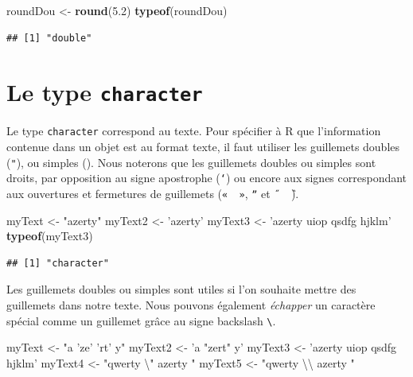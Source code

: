 \documentclass[
]{book}
\newenvironment{Shaded}{\begin{snugshade}}{\end{snugshade}}
\newcommand{\CharTok}[1]{\textcolor[rgb]{0.31,0.60,0.02}{#1}}
\newcommand{\FloatTok}[1]{\textcolor[rgb]{0.00,0.00,0.81}{#1}}
\newcommand{\KeywordTok}[1]{\textcolor[rgb]{0.13,0.29,0.53}{\textbf{#1}}}
\newcommand{\NormalTok}[1]{#1}
\newcommand{\StringTok}[1]{\textcolor[rgb]{0.31,0.60,0.02}{#1}}
\begin{document}
\begin{Shaded}
\begin{Highlighting}[]
\NormalTok{roundDou <-}\StringTok{ }\KeywordTok{round}\NormalTok{(}\FloatTok{5.2}\NormalTok{)}
\KeywordTok{typeof}\NormalTok{(roundDou)}
\end{Highlighting}
\end{Shaded}

\begin{verbatim}
## [1] "double"
\end{verbatim}

\hypertarget{le-type-character}{%
\section{\texorpdfstring{Le type \texttt{character}}{Le type character}}\label{le-type-character}}

Le type \texttt{character} correspond au texte. Pour spécifier à R que l'information contenue dans un objet est au format texte, il faut utiliser les guillemets doubles (\texttt{"}), ou simples (\texttt{\textquotesingle{}}). Nous noterons que les guillemets doubles ou simples sont droits, par opposition au signe apostrophe (\texttt{‘}) ou encore aux signes correspondant aux ouvertures et fermetures de guillemets (\texttt{«\ \ »}, \texttt{ˮ} et \texttt{˝\ \ ̏}).

\begin{Shaded}
\begin{Highlighting}[]
\NormalTok{myText <-}\StringTok{ "azerty"}
\NormalTok{myText2 <-}\StringTok{ 'azerty'}
\NormalTok{myText3 <-}\StringTok{ 'azerty uiop qsdfg hjklm'}
\KeywordTok{typeof}\NormalTok{(myText3)}
\end{Highlighting}
\end{Shaded}

\begin{verbatim}
## [1] "character"
\end{verbatim}

Les guillemets doubles ou simples sont utiles si l'on souhaite mettre des guillemets dans notre texte. Nous pouvons également \emph{échapper} un caractère spécial comme un guillemet grâce au signe backslash \texttt{\textbackslash{}}.

\begin{Shaded}
\begin{Highlighting}[]
\NormalTok{myText <-}\StringTok{ "a 'ze' 'rt' y"}
\NormalTok{myText2 <-}\StringTok{ 'a "zert" y'}
\NormalTok{myText3 <-}\StringTok{ 'azerty uiop qsdfg hjklm'}
\NormalTok{myText4 <-}\StringTok{ "qwerty }\CharTok{\textbackslash{}"}\StringTok{ azerty "}
\NormalTok{myText5 <-}\StringTok{ "qwerty }\CharTok{\textbackslash{}\textbackslash{}}\StringTok{ azerty "}
\end{Highlighting}
\end{Shaded}
\end{document}
